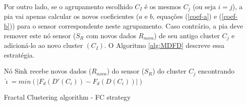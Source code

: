 \documentclass{acm_proc_article-sp}
\begin{document}
Por outro lado, se o agrupamento escolhido $C_I$ é os mesmos $C_j$ (ou seja 
$ i = j $), a pia vai apenas calcular os novos coeficientes ($a$ e $b$, equações 
(\ref {coef-a}) e (\ref {coef-b})) para o sensor correspondente neste agrupamento. 
Caso contrário, a pia deve remover este nó sensor ($S_{R}$ com novos dados 
$R_{nova}$) de seu antigo cluster $C_j$ e adicioná-lo ao novo cluster $(C_I)$.
O Algoritmo \ref{alg:MDFD} descreve essa estratégia.
\vspace*{-.3cm}

\begin{algorithm}
 \SetAlgoLined
 \LinesNumbered
 \small
  Nó Sink recebe novos dados ($R_{nova}$) do sensor ($S_{R}$) do cluster $C_j$\;
   encontrando $\hat{\imath} = min(|F_d(D'(C_i)) - F_d(D(C_i))|)$\;
 \caption{Fractal Clustering algorithm - FC strategy}
 \label{alg:MDFD}
\end{algorithm}
\end{document}
